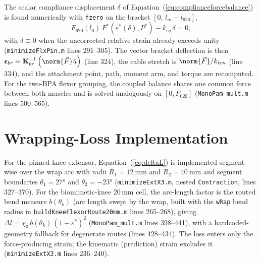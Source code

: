 The scalar compliance displacement $\delta$ of Equation~(\ref{eq:complianceforcebalance}) is found numerically with \texttt{fzero} on the bracket $[0,\, l_{m}-l_{620}]$,
\begin{equation}
    F_{620}(l_{0})\,F^{*}\!\left(\varepsilon^{*}(\delta),P^{*}\right) - k_{eq}\,\delta = 0,
    \label{eq:app_forcebalance}
\end{equation}
with $\delta \equiv 0$ when the uncorrected relative strain already exceeds unity (\texttt{minimizeFlxPin.m} lines 291--305). The vector bracket deflection is then $\boldsymbol{\epsilon}_{br} = \mathbf{K}_{br}^{-1}\left(\norm{\vec{F}}\hat{u}\right)$ (line 324), the cable stretch is $\norm{\vec{F}}/k_{ten}$ (line 334), and the attachment point, path, moment arm, and torque are recomputed. For the two-BPA flexor grouping, the coupled balance shares one common force between both muscles and is solved analogously on $[0, F_{620}]$ (\texttt{MonoPam\_mult.m} lines 500--565).

\section{Wrapping-Loss Implementation}

For the pinned-knee extensor, Equation~(\ref{eq:deltaL}) is implemented segment-wise over the wrap arc with radii $R_1 = \qty{12}{\mm}$ and $R_2 = \qty{40}{\mm}$ and segment boundaries $\theta_{1} = \ang{27}$ and $\theta_{2} = \ang{-23}$ (\texttt{minimizeExtX3.m}, nested \texttt{Contraction}, lines 327--370). For the biomimetic-knee 20\,mm cell, the arc-length factor is the routed bend measure $b(\theta_{k})$ (arc length swept by the wrap, built with the \texttt{wRap} bend radius in \texttt{buildKneeFlexorRoute20mm.m} lines 265--268), giving $\Delta l = \chi_{3}\, b(\theta_{k})\,(1-\varepsilon^{*})^{2}$ (\texttt{MonoPam\_mult.m} lines 398--441), with a hardcoded-geometry fallback for degenerate routes (lines 428--434). The loss enters only the force-producing strain; the kinematic (prediction) strain excludes it (\texttt{minimizeExtX3.m} lines 236--240).
